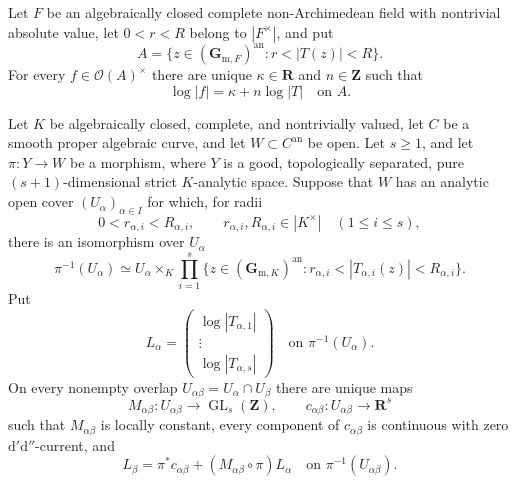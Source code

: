 \begin{lemma}
\label{lem:p062-open-annulus-unit-integral-slope}
Let $F$ be an algebraically closed complete non-Archimedean field with
nontrivial absolute value, let $0<r<R$ belong to $|F^\times|$, and put
\[
 A=\{z\in(\mathbf G_{\mathrm m,F})^{\mathrm{an}}:r<|T(z)|<R\}.
\]
For every $f\in\mathcal O(A)^\times$ there are unique
$\kappa\in\mathbf R$ and $n\in\mathbf Z$ such that
\begin{equation}
\label{eq:p062-open-annulus-unit-integral-slope}
                 \log|f|=\kappa+n\log|T|
                 \quad\text{on }A.
\end{equation}
\end{lemma}

\begin{proposition}
\label{prop:p062-polyannulus-bundle-slope-local-system}
Let $K$ be algebraically closed, complete, and nontrivially valued, let
$C$ be a smooth proper algebraic curve, and let $W\subset C^{\mathrm{an}}$
be open.  Let $s\geq1$, and let $\pi:Y\to W$ be a morphism, where $Y$ is a
good, topologically separated, pure $(s+1)$-dimensional strict $K$-analytic
space.  Suppose that $W$ has an analytic open cover
$(U_\alpha)_{\alpha\in I}$ for which, for radii
\[
 0<r_{\alpha,i}<R_{\alpha,i},
 \qquad r_{\alpha,i},R_{\alpha,i}\in|K^\times|
 \quad(1\leq i\leq s),
\]
there is an isomorphism over $U_\alpha$
\[
 \pi^{-1}(U_\alpha)\simeq
 U_\alpha\times_K\prod_{i=1}^s
 \{z\in(\mathbf G_{\mathrm m,K})^{\mathrm{an}}:
            r_{\alpha,i}<|T_{\alpha,i}(z)|<R_{\alpha,i}\}.
\]
Put
\[
 L_\alpha=
 \begin{pmatrix}
  \log|T_{\alpha,1}|\\[-2pt]
  \vdots\\[-2pt]
  \log|T_{\alpha,s}|
 \end{pmatrix}
 \quad\text{on }\pi^{-1}(U_\alpha).
\]
On every nonempty overlap $U_{\alpha\beta}=U_\alpha\cap U_\beta$ there
are unique maps
\[
 M_{\alpha\beta}:U_{\alpha\beta}\longrightarrow
      \operatorname{GL}_s(\mathbf Z),
 \qquad
 c_{\alpha\beta}:U_{\alpha\beta}\longrightarrow\mathbf R^s
\]
such that $M_{\alpha\beta}$ is locally constant, every component of
$c_{\alpha\beta}$ is continuous with zero $\mathrm d'\mathrm d''$-current,
and
\begin{equation}
\label{eq:p062-annular-coordinate-transition}
 L_\beta
 =\pi^*c_{\alpha\beta}+
   (M_{\alpha\beta}\circ\pi)L_\alpha
 \quad\text{on }\pi^{-1}(U_{\alpha\beta}).
\end{equation}

\end{proposition}
